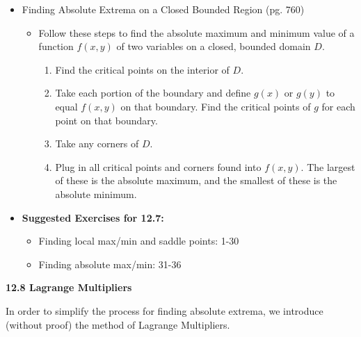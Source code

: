\documentclass[12pt]{article}
\theoremstyle{plain}
\theoremstyle{definition}
\theoremstyle{remark}
\begin{document}
\begin{itemize}
	\item Finding Absolute Extrema on a Closed Bounded Region (pg. 760)
	
		\begin{itemize}
		\item Follow these steps to find the absolute maximum and minimum value of a function $f(x,y)$ of two variables on a closed, bounded domain $D$.
			\begin{enumerate}
			\item Find the critical points on the interior of $D$.
			\item Take each portion of the boundary and define $g(x)$ or $g(y)$ to equal $f(x,y)$ on that boundary. Find the critical points of $g$ for each point on that boundary.
			\item Take any corners of $D$.
			\item Plug in all critical points and corners found into $f(x,y)$. The largest of these is the absolute maximum, and the smallest of these is the absolute minimum.
			\end{enumerate}
		\end{itemize}
		
	\item \textbf{Suggested Exercises for 12.7:}
	
		\begin{itemize}
		\item Finding local max/min and saddle points: 1-30
		\item Finding absolute max/min: 31-36
		\end{itemize}
		
	\end{itemize}
	
	\newpage
	
	\centerline{\bf 12.8 Lagrange Multipliers}
	
	In order to simplify the process for finding absolute extrema, we introduce (without proof) the method of Lagrange Multipliers.
	
\end{document}
